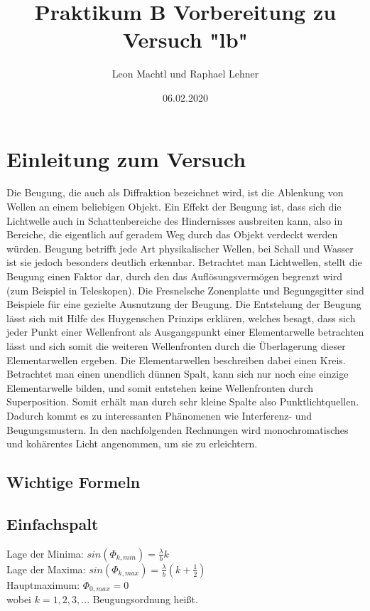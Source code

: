 \documentclass[a4paper,10pt]{scrartcl}
\title{Praktikum B Vorbereitung zu Versuch "lb"}
\author{Leon Machtl und Raphael Lehner}
\date{06.02.2020}
\begin{document}
	\maketitle
	\tableofcontents
	\newpage
	
	\section{Einleitung zum Versuch}
	
	Die Beugung, die auch als Diffraktion bezeichnet wird, ist die Ablenkung von Wellen an einem beliebigen Objekt. Ein Effekt der Beugung ist, dass sich die Lichtwelle auch in Schattenbereiche des Hindernisses ausbreiten kann, also in Bereiche, die eigentlich auf geradem Weg durch das Objekt verdeckt werden würden. Beugung betrifft jede Art physikalischer Wellen, bei Schall und Wasser ist sie jedoch besonders deutlich erkennbar. Betrachtet man Lichtwellen, stellt die Beugung einen Faktor dar, durch den das Auflösungsvermögen begrenzt wird (zum Beispiel in Teleskopen). Die Fresnelsche Zonenplatte und Begungsgitter sind Beispiele für eine gezielte Ausnutzung der Beugung. Die Entstehung der Beugung lässt sich mit Hilfe des Huygenschen Prinzips erklären, welches besagt, dass sich jeder Punkt einer Wellenfront als Ausgangspunkt einer Elementarwelle betrachten lässt und sich somit die weiteren Wellenfronten durch die Überlagerung dieser Elementarwellen ergeben. Die Elementarwellen beschreiben dabei einen Kreis. Betrachtet man einen unendlich dünnen Spalt, kann sich nur noch eine einzige Elementarwelle bilden, und somit entstehen keine Wellenfronten durch Superposition. Somit erhält man durch sehr kleine Spalte also Punktlichtquellen. Dadurch kommt es zu interessanten Phänomenen wie Interferenz- und Beugungsmustern. In den nachfolgenden Rechnungen wird monochromatisches und kohärentes Licht angenommen, um sie zu erleichtern.
	
	\subsection{Wichtige Formeln}
		\subsection{Einfachspalt}
			Lage der Minima: \(sin(\Phi_{k,min})=\frac{\lambda}{b}k\) \\
			Lage der Maxima: \(sin(\Phi_{k,max})=\frac{\lambda}{b}(k+\frac{1}{2})\)\\
			Hauptmaximum: \(\Phi_{0,max}=0\)\\
			wobei \(k=1,2,3,...\) Beugungsordnung heißt.
			
\end{document}
